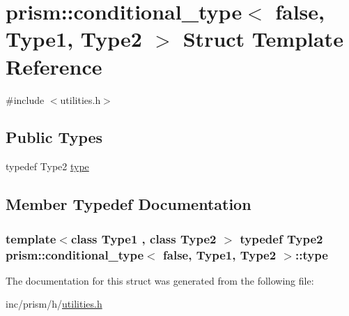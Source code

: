 \hypertarget{structprism_1_1conditional__type_3_01false_00_01_type1_00_01_type2_01_4}{}\section{prism\+:\+:conditional\+\_\+type$<$ false, Type1, Type2 $>$ Struct Template Reference}
\label{structprism_1_1conditional__type_3_01false_00_01_type1_00_01_type2_01_4}


{\ttfamily \#include $<$utilities.\+h$>$}

\subsection*{Public Types}
\begin{DoxyCompactItemize}
\item 
typedef Type2 \hyperlink{structprism_1_1conditional__type_3_01false_00_01_type1_00_01_type2_01_4_ab06b40a3cd6b35aa1871c1c8e6d7930f}{type}
\end{DoxyCompactItemize}


\subsection{Member Typedef Documentation}
\subsubsection[{\texorpdfstring{type}{type}}]{\setlength{\rightskip}{0pt plus 5cm}template$<$class Type1 , class Type2 $>$ typedef Type2 {\bf prism\+::conditional\+\_\+type}$<$ false, Type1, Type2 $>$\+::{\bf type}}\hypertarget{structprism_1_1conditional__type_3_01false_00_01_type1_00_01_type2_01_4_ab06b40a3cd6b35aa1871c1c8e6d7930f}{}\label{structprism_1_1conditional__type_3_01false_00_01_type1_00_01_type2_01_4_ab06b40a3cd6b35aa1871c1c8e6d7930f}


The documentation for this struct was generated from the following file\+:\begin{DoxyCompactItemize}
\item 
inc/prism/h/\hyperlink{utilities_8h}{utilities.\+h}\end{DoxyCompactItemize}
